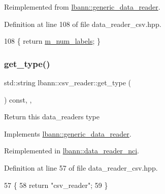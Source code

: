 Reimplemented from \hyperlink{classlbann_1_1generic__data__reader_a935ce6262d75f1834e550c3bc16a6547}{lbann\+::generic\+\_\+data\+\_\+reader}.



Definition at line 108 of file data\+\_\+reader\+\_\+csv.\+hpp.


\begin{DoxyCode}
108 \{ \textcolor{keywordflow}{return} \hyperlink{classlbann_1_1csv__reader_a8e377a058039b3d906738143356b93e4}{m\_num\_labels}; \}
\end{DoxyCode}
\mbox{\label{classlbann_1_1csv__reader_a0ff6a8f07f69a0927ba0bac36ad31864}} 
\subsubsection{\texorpdfstring{get\+\_\+type()}{get\_type()}}
{\footnotesize\ttfamily std\+::string lbann\+::csv\+\_\+reader\+::get\+\_\+type (\begin{DoxyParamCaption}{ }\end{DoxyParamCaption}) const\hspace{0.3cm}{\ttfamily [inline]}, {\ttfamily [override]}, {\ttfamily [virtual]}}

Return this data\+\_\+reader\textquotesingle{}s type 

Implements \hyperlink{classlbann_1_1generic__data__reader_abeb849fb8e10b4fa317c90bc33f61758}{lbann\+::generic\+\_\+data\+\_\+reader}.



Reimplemented in \hyperlink{classlbann_1_1data__reader__nci_a6709a3d1df162335fa4a6955ea7dcaa2}{lbann\+::data\+\_\+reader\+\_\+nci}.



Definition at line 57 of file data\+\_\+reader\+\_\+csv.\+hpp.


\begin{DoxyCode}
57                                       \{
58     \textcolor{keywordflow}{return} \textcolor{stringliteral}{"csv\_reader"};
59   \}
\end{DoxyCode}
\mbox{\label{classlbann_1_1csv__reader_a7b76b23422db407e8fb039cc11a08bc6}} 
